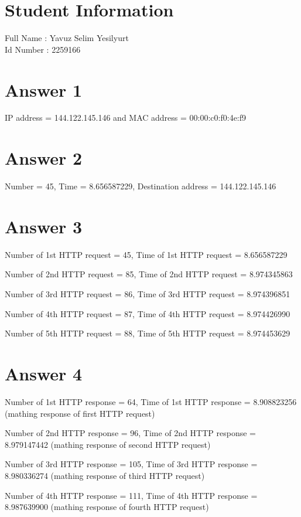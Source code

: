 \documentclass[10pt]{article}
\begin{document}
\section*{Student Information } 
Full Name : Yavuz Selim Yesilyurt \\
Id Number : 2259166 \\

\section*{Answer 1}
\hspace{4mm}	
IP address = 144.122.145.146 and MAC address = 00:00:c0:f0:4e:f9

\section*{Answer 2}
\hspace{4mm}	
Number = 45, Time = 8.656587229, Destination address = 144.122.145.146

\section*{Answer 3}
\hspace{4mm}	
Number of 1st HTTP request = 45, Time of 1st HTTP request = 8.656587229

Number of 2nd HTTP request = 85, Time of 2nd HTTP request = 8.974345863

Number of 3rd HTTP request = 86, Time of 3rd HTTP request = 8.974396851

Number of 4th HTTP request = 87, Time of 4th HTTP request = 8.974426990

Number of 5th HTTP request = 88, Time of 5th HTTP request = 8.974453629


\section*{Answer 4}
\hspace{4mm}	
   Number of 1st HTTP response = 64, Time of 1st HTTP response = 8.908823256 (mathing response of first HTTP request)
   
   Number of 2nd HTTP response = 96, Time of 2nd HTTP response = 8.979147442 (mathing response of second HTTP request)

   Number of 3rd HTTP response = 105, Time of 3rd HTTP response = 8.980336274 (mathing response of third HTTP request)

   Number of 4th HTTP response = 111, Time of 4th HTTP response = 8.987639900 (mathing response of fourth HTTP request)
\end{document}
